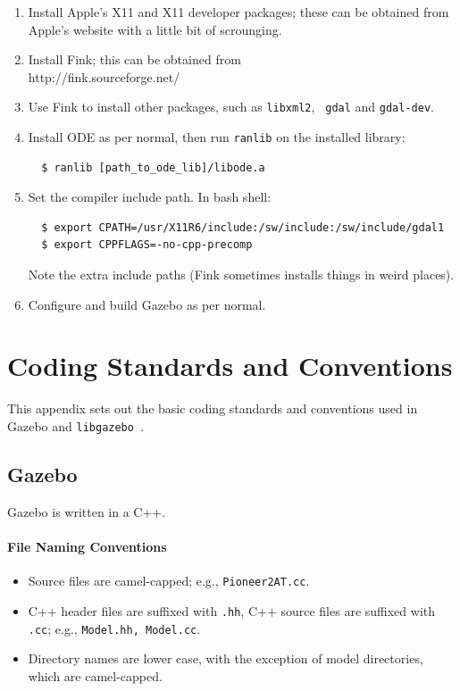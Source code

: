 \documentclass[11pt]{report}
\def\libgazebo {{\tt libgazebo}~}
\begin{document}
\begin{enumerate}
\item Install Apple's X11 and X11 developer packages; these can be
obtained from Apple's website with a little bit of scrounging.
\item Install Fink; this can be obtained from 
\\ \indent http://fink.sourceforge.net/
\item Use Fink to install other packages, such as {\tt libxml2}, {\tt
gdal} and {\tt gdal-dev}.
\item Install ODE as per normal, then run {\tt ranlib} on the
installed library:
  \begin{verbatim}
  $ ranlib [path_to_ode_lib]/libode.a \end{verbatim} %
\item Set the compiler include path.  In bash shell:
  \begin{verbatim}
  $ export CPATH=/usr/X11R6/include:/sw/include:/sw/include/gdal1
  $ export CPPFLAGS=-no-cpp-precomp \end{verbatim} %
Note the extra include paths (Fink sometimes installs things in weird
places).
\item Configure and build Gazebo as per normal.
\end{enumerate}


\chapter{Coding Standards and Conventions}
\label{sec.gazebo.standards}


This appendix sets out the basic coding standards and conventions used
in Gazebo and \libgazebo.  

\section{Gazebo}

Gazebo is written in a C++.


\subsubsection{File Naming Conventions}

\begin{itemize}
\item Source files are camel-capped; e.g., {\tt Pioneer2AT.cc}.
\item C++ header files are suffixed with {\tt .hh}, C++ source files are
suffixed with {\tt .cc}; e.g., {\tt Model.hh, Model.cc}.
\item Directory names are lower case, with the exception of model
directories, which are camel-capped.
\end{itemize}
\end{document}
